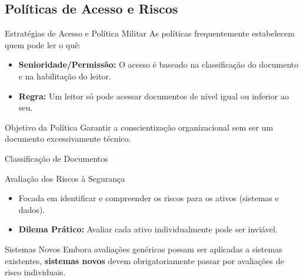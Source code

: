 \documentclass[aspectratio=169]{beamer}
\begin{document}
\subsection{Políticas de Acesso e Riscos}
\begin{frame}{Estratégias de Acesso e Política Militar}
    As políticas frequentemente estabelecem quem pode ler o quê:
    \begin{itemize}
        \item \textbf{Senioridade/Permissão:} O acesso é baseado na classificação do documento e na habilitação do leitor.
        \item \textbf{Regra:} Um leitor só pode acessar documentos de nível igual ou inferior ao seu.
    \end{itemize}
    \begin{block}{Objetivo da Política}
        Garantir a conscientização organizacional sem ser um documento excessivamente técnico.
    \end{block}
\end{frame}

\begin{frame}{Classificação de Documentos}
    \centering
\end{frame}

\begin{frame}{Avaliação dos Riscos à Segurança}
    \begin{itemize}
        \item Focada em identificar e compreender os riscos para os ativos (sistemas e dados).
        \item \textbf{Dilema Prático:} Avaliar cada ativo individualmente pode ser inviável.
    \end{itemize}
    \begin{exampleblock}{Sistemas Novos}
        Embora avaliações genéricas possam ser aplicadas a sistemas existentes, \textbf{sistemas novos} devem obrigatoriamente passar por avaliações de risco individuais.
    \end{exampleblock}
\end{frame}
\end{document}
